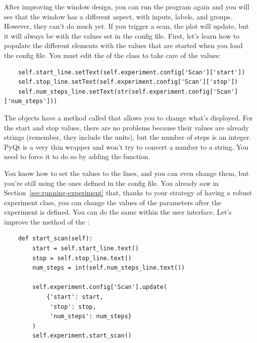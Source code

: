 
After improving the window design, you can run the program again and you will see that the window has a different aspect, with inputs, labels, and groups. However, they can't do much yet. If you trigger a scan, the plot will update, but it will always be with the values set in the config file. First, let's learn how to populate the different elements with the values that are started when you load the config file. You must edit the  of the  class to take care of the values:

\begin{verbatim}
    self.start_line.setText(self.experiment.config['Scan']['start'])
    self.stop_line.setText(self.experiment.config['Scan']['stop'])
    self.num_steps_line.setText(str(self.experiment.config['Scan'] ['num_steps']))
\end{verbatim}

The  objects have a method called  that allows you to change what's displayed. For the start and stop values, there are no problems because their values are already strings (remember, they include the units), but the number of steps is an integer. PyQt is a very thin wrapper and won't try to convert a number to a string. You need to force it to do so by adding the  function.


You know how to set the values to the lines, and you can even change them, but you're still using the ones defined in the config file. You already saw in Section~\ref{sec:running-experiment} that, thanks to your strategy of having a robust experiment class, you can change the values of the parameters after the experiment is defined. You can do the same within the user interface. Let's improve the  method of the :

\begin{verbatim}
    def start_scan(self):
        start = self.start_line.text()
        stop = self.stop_line.text()
        num_steps = int(self.num_steps_line.text())

        self.experiment.config['Scan'].update(
            {'start': start,
             'stop': stop,
             'num_steps': num_steps}
        )
        self.experiment.start_scan()
\end{verbatim}

